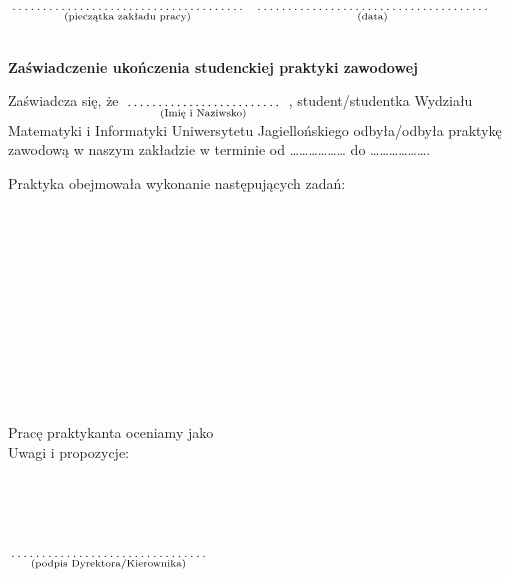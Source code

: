\documentclass[a4paper,11pt]{article}
\newcommand{\fillField}[2]{
    $\underset{\text{#1}}{\parbox[t]{#2}{\dotfill}}$
}
\begin{document}
\noindent
\fillField{(pieczątka zakładu pracy)}{6cm} \hfill \fillField{(data)}{6cm} \\\\

\vskip 1.0cm
\begin{center}
{\Large \textbf{Zaświadczenie ukończenia studenckiej praktyki zawodowej}}
\end{center}
\vskip 0.5cm


\noindent
Zaświadcza się, że \fillField{(Imię i Naziwsko)}{4cm}, student/studentka Wydziału Matematyki i Informatyki Uniwersytetu Jagiellońskiego odbyła/odbyła praktykę zawodową w naszym zakładzie w terminie od ……………… do ……………….

\noindent
Praktyka obejmowała wykonanie następujących zadań: \\
\phantom{a}\dotfill \\
\phantom{a}\dotfill \\
\phantom{a}\dotfill \\
\phantom{a}\dotfill \\
\phantom{a}\dotfill \\
\phantom{a}\dotfill \\
\phantom{a}\dotfill \\
\phantom{a}\dotfill \\
\phantom{a}\dotfill \\
\phantom{a}\dotfill \\
\phantom{a}\dotfill \\
\phantom{a}\dotfill 


\noindent
Pracę praktykanta oceniamy jako \dotfill \\
Uwagi i propozycje: \dotfill \\
\phantom{a}\dotfill \\
\phantom{a}\dotfill \\
\phantom{a}\dotfill \\
\phantom{a}\dotfill \\
\phantom{a}\dotfill 

\vskip 1.2cm
\hspace{\fill} \fillField{(podpis Dyrektora/Kierownika)}{5cm} \hspace{2.0cm}
\end{document}
